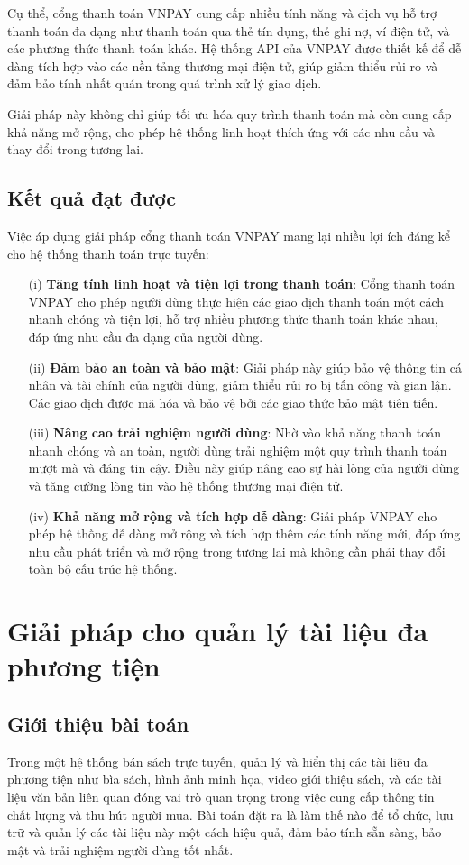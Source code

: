 \documentclass[../DoAn.tex]{subfiles}
\begin{document}
Cụ thể, cổng thanh toán VNPAY cung cấp nhiều tính năng và dịch vụ hỗ trợ thanh toán đa dạng như thanh toán qua thẻ tín dụng, thẻ ghi nợ, ví điện tử, và các phương thức thanh toán khác. Hệ thống API của VNPAY được thiết kế để dễ dàng tích hợp vào các nền tảng thương mại điện tử, giúp giảm thiểu rủi ro và đảm bảo tính nhất quán trong quá trình xử lý giao dịch.

Giải pháp này không chỉ giúp tối ưu hóa quy trình thanh toán mà còn cung cấp khả năng mở rộng, cho phép hệ thống linh hoạt thích ứng với các nhu cầu và thay đổi trong tương lai.

\subsection{Kết quả đạt được}
Việc áp dụng giải pháp cổng thanh toán VNPAY mang lại nhiều lợi ích đáng kể cho hệ thống thanh toán trực tuyến:
\begin{enumerate}
    \item[(i)] \textbf{Tăng tính linh hoạt và tiện lợi trong thanh toán}: Cổng thanh toán VNPAY cho phép người dùng thực hiện các giao dịch thanh toán một cách nhanh chóng và tiện lợi, hỗ trợ nhiều phương thức thanh toán khác nhau, đáp ứng nhu cầu đa dạng của người dùng.
    \item[(ii)] \textbf{Đảm bảo an toàn và bảo mật}: Giải pháp này giúp bảo vệ thông tin cá nhân và tài chính của người dùng, giảm thiểu rủi ro bị tấn công và gian lận. Các giao dịch được mã hóa và bảo vệ bởi các giao thức bảo mật tiên tiến.
    \item[(iii)] \textbf{Nâng cao trải nghiệm người dùng}: Nhờ vào khả năng thanh toán nhanh chóng và an toàn, người dùng trải nghiệm một quy trình thanh toán mượt mà và đáng tin cậy. Điều này giúp nâng cao sự hài lòng của người dùng và tăng cường lòng tin vào hệ thống thương mại điện tử.
    \item[(iv)] \textbf{Khả năng mở rộng và tích hợp dễ dàng}: Giải pháp VNPAY cho phép hệ thống dễ dàng mở rộng và tích hợp thêm các tính năng mới, đáp ứng nhu cầu phát triển và mở rộng trong tương lai mà không cần phải thay đổi toàn bộ cấu trúc hệ thống.
\end{enumerate}

\section{Giải pháp cho quản lý tài liệu đa phương tiện}
\subsection{Giới thiệu bài toán}
Trong một hệ thống bán sách trực tuyến, quản lý và hiển thị các tài liệu đa phương tiện như bìa sách, hình ảnh minh họa, video giới thiệu sách, và các tài liệu văn bản liên quan đóng vai trò quan trọng trong việc cung cấp thông tin chất lượng và thu hút người mua. Bài toán đặt ra là làm thế nào để tổ chức, lưu trữ và quản lý các tài liệu này một cách hiệu quả, đảm bảo tính sẵn sàng, bảo mật và trải nghiệm người dùng tốt nhất.
\end{document}

